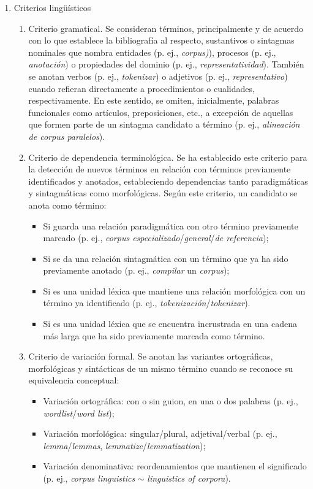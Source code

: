 \begin{enumerate}
    \item Criterios lingüísticos
    \begin{enumerate}
        \item Criterio gramatical. Se consideran términos, principalmente y de acuerdo con lo que establece la bibliografía al respecto, sustantivos o sintagmas nominales que nombra entidades (p. ej., \textit{corpus)}), procesos (p. ej., \textit{anotación}) o propiedades del dominio (p. ej., \textit{representatividad}). También se anotan verbos (p. ej., \textit{tokenizar}) o adjetivos (p. ej., \textit{representativo}) cuando refieran directamente a procedimientos o cualidades, respectivamente. En este sentido, se omiten, inicialmente, palabras funcionales como artículos, preposiciones, etc., a excepción de aquellas que formen parte de un sintagma candidato a término (p. ej., \textit{alineación de corpus paralelos}).
        \item Criterio de dependencia terminológica. Se ha establecido este criterio para la detección de nuevos términos en relación con términos previamente identificados y anotados, estableciendo dependencias tanto paradigmáticas y sintagmáticas como morfológicas. Según este criterio, un candidato se anota como término:
        \begin{itemize}
            \item Si guarda una relación paradigmática con otro término previamente marcado (p. ej., \textit{corpus especializado}/\textit{general}/\textit{de referencia});
            \item Si se da una relación sintagmática con un término que ya ha sido previamente anotado (p. ej., \textit{compilar} un \textit{corpus});
            \item Si es una unidad léxica que mantiene una relación morfológica con un término ya identificado (p. ej., \textit{tokenización}/\textit{tokenizar}).
            \item Si es una unidad léxica que se encuentra incrustrada en una cadena más larga que ha sido previamente marcada como término.
        \end{itemize}
                \item Criterio de variación formal. Se anotan las variantes ortográficas, morfológicas y sintácticas de un mismo término cuando se reconoce su equivalencia conceptual:
        \begin{itemize}
            \item Variación ortográfica: con o sin guion, en una o dos palabras (p. ej., \textit{wordlist}/\textit{word list});
            \item Variación morfológica: singular/plural, adjetival/verbal (p. ej., \textit{lemma}/\textit{lemmas}, \textit{lemmatize}/\textit{lemmatization});
            \item Variación denominativa: reordenamientos que mantienen el significado (p. ej., \textit{corpus linguistics} $\sim$ \textit{linguistics of corpora}).
        \end{itemize}


\end{enumerate}
\end{enumerate}
